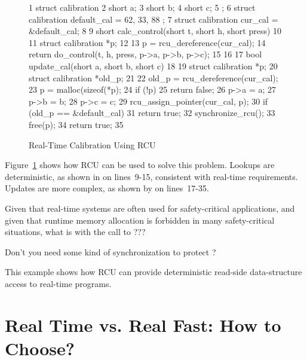 \begin{figure}[tb]
{ \scriptsize
\begin{verbbox}
 1 struct calibration {
 2   short a;
 3   short b;
 4   short c;
 5 };
 6 struct calibration default_cal = { 62, 33, 88 };
 7 struct calibration cur_cal = &default_cal;
 8
 9 short calc_control(short t, short h, short press)
10 {
11   struct calibration *p;
12
13   p = rcu_dereference(cur_cal);
14   return do_control(t, h, press, p->a, p->b, p->c);
15 }
16
17 bool update_cal(short a, short b, short c)
18 {
19   struct calibration *p;
20   struct calibration *old_p;
21
22   old_p = rcu_dereference(cur_cal);
23   p = malloc(sizeof(*p);
24   if (!p)
25     return false;
26   p->a = a;
27   p->b = b;
28   p->c = c;
29   rcu_assign_pointer(cur_cal, p);
30   if (old_p == &default_cal)
31     return true;
32   synchronize_rcu();
33   free(p);
34   return true;
35 }
\end{verbbox}
}
\centering
\theverbbox
\caption{Real-Time Calibration Using RCU}
\label{fig:rt:Real-Time Calibration Using RCU}
\end{figure}

Figure~\ref{fig:rt:Real-Time Calibration Using RCU}
shows how RCU can be used to solve this problem.
Lookups are deterministic, as shown in 
on lines~9-15, consistent with real-time requirements.
Updates are more complex, as shown by 
on lines~17-35.

\QuickQuiz{}
	Given that real-time systems are often used for safety-critical
	applications, and given that runtime memory allocation is
	forbidden in many safety-critical situations, what is with
	the call to ???
 \QuickQuizEnd

\QuickQuiz{}
	Don't you need some kind of synchronization to protect
	?
 \QuickQuizEnd

This example shows how RCU can provide deterministic read-side
data-structure access to real-time programs.

\section{Real Time vs. Real Fast: How to Choose?}
\label{sec:rt:Real Time vs. Real Fast: How to Choose?}

